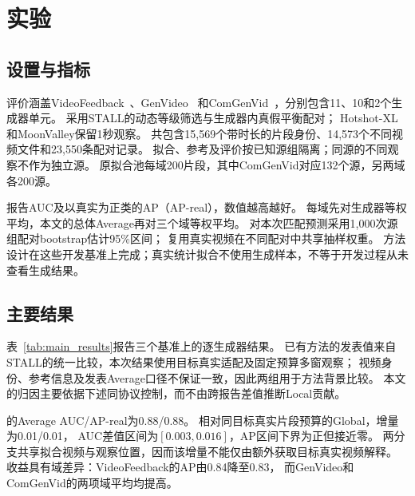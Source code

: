 \section{实验}
\label{sec:experiments}

\subsection{设置与指标}
评价涵盖VideoFeedback~\cite{he2024videoscore}、GenVideo~\cite{chen2024genvideo}
和ComGenVid~\cite{benhayun2026stall}，分别包含11、10和2个生成器单元。
采用STALL的动态等级筛选与生成器内真假平衡配对；
Hotshot-XL和MoonValley保留1秒观察。
共包含15,569个带时长的片段身份、14,573个不同视频文件和23,550条配对记录。
拟合、参考及评价按已知源组隔离；同源的不同观察不作为独立源。
原拟合池每域200片段，其中ComGenVid对应132个源，另两域各200源。

报告AUC及以真实为正类的AP（AP-real），数值越高越好。
每域先对生成器等权平均，本文的总体Average再对三个域等权平均。
对本次匹配预测采用1,000次源组配对bootstrap估计95\%区间；
复用真实视频在不同配对中共享抽样权重。
方法设计在这些开发基准上完成；真实统计拟合不使用生成样本，不等于开发过程从未查看生成结果。

\subsection{主要结果}



表~\ref{tab:main_results}报告三个基准上的逐生成器结果。
已有方法的发表值来自STALL的统一比较，本次结果使用目标真实适配及固定预算多窗观察；
视频身份、参考信息及发表Average口径不保证一致，因此两组用于方法背景比较。
本文的归因主要依据下述同协议控制，而不由跨报告差值推断Local贡献。

\method 的Average AUC/AP-real为0.88/0.88。
相对同目标真实片段预算的Global，增量为0.01/0.01，
AUC差值区间为$[0.003,0.016]$，AP区间下界为正但接近零。
两分支共享拟合视频与观察位置，因而该增量不能仅由额外获取目标真实视频解释。
收益具有域差异：VideoFeedback的AP由0.84降至0.83，
而GenVideo和ComGenVid的两项域平均均提高。
